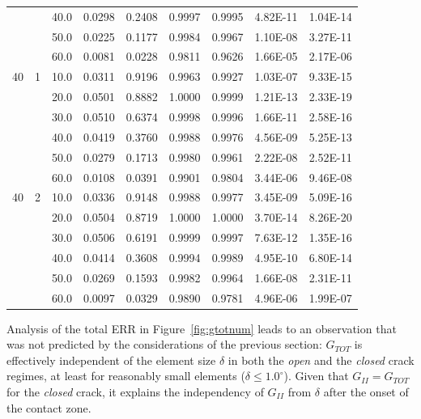 \documentclass[review]{elsarticle}
\begin{document}
\begin{table}[!h]
\begin{tabular}{ccccccccc}
&&		\small40.0&	\small0.0298&\small	0.2408&\small	0.9997&\small	0.9995&\small	4.82E-11&\small	1.04E-14\\
&&		\small50.0&	\small0.0225&\small	0.1177&\small	0.9984&\small	0.9967&\small	1.10E-08&\small	3.27E-11\\
&&		\small60.0&	\small0.0081&\small	0.0228&\small	0.9811&\small	0.9626&\small	1.66E-05&\small	2.17E-06\\
\midrule
\small40&\small1&	\small10.0&	\small0.0311&	\small0.9196&	\small0.9963&	\small0.9927&	\small1.03E-07&	\small9.33E-15\\
&&		\small20.0&	\small0.0501&\small	0.8882&\small	1.0000&\small	0.9999&\small	1.21E-13&\small	2.33E-19\\
&&		\small30.0&	\small0.0510&\small	0.6374&\small	0.9998&\small	0.9996&\small	1.66E-11&\small	2.58E-16\\
&&		\small40.0&	\small0.0419&\small	0.3760&\small	0.9988&\small	0.9976&\small	4.56E-09&\small	5.25E-13\\
&&		\small50.0&	\small0.0279&\small	0.1713&\small	0.9980&\small	0.9961&\small	2.22E-08&\small	2.52E-11\\
&&		\small60.0&	\small0.0108&\small	0.0391&\small	0.9901&\small	0.9804&\small	3.44E-06&\small	9.46E-08\\
\midrule
\small40&\small2&	\small10.0&	\small0.0336&	\small0.9148&	\small0.9988&	\small0.9977&	\small3.45E-09&	\small5.09E-16\\
&&		\small20.0&	\small0.0504&\small	0.8719&\small	1.0000&\small	1.0000&\small	3.70E-14&\small	8.26E-20\\
&&		\small30.0&	\small0.0506&\small	0.6191&\small	0.9999&\small	0.9997&\small	7.63E-12&\small	1.35E-16\\
&&		\small40.0&	\small0.0414&\small	0.3608&\small	0.9994&\small	0.9989&\small	4.95E-10&\small	6.80E-14\\
&&		\small50.0&	\small0.0269&\small	0.1593&\small	0.9982&\small	0.9964&\small	1.66E-08&\small	2.31E-11\\
&&		\small60.0&	\small0.0097&\small	0.0329&\small	0.9890&\small	0.9781&\small	4.96E-06&\small	1.99E-07\\
\end{tabular}
\end{table}

Analysis of the total ERR in Figure~\ref{fig:gtotnum} leads to an observation that was not predicted by the considerations of the previous section: $G_{TOT}$ is effectively independent of the element size $\delta$ in both the \emph{open} and the \emph{closed} crack regimes, at least for reasonably small elements ($\delta\leq1.0^{\circ}$). Given that $G_{II}=G_{TOT}$ for the \emph{closed} crack, it explains the independency of $G_{II}$ from $\delta$ after the onset of the contact zone.
\end{document}
